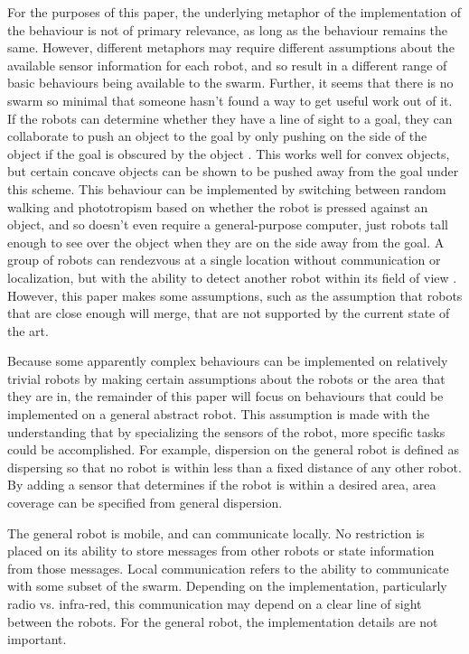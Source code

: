\documentclass[]{article}
\begin{document}
For the purposes of this paper, the underlying metaphor of the implementation of the behaviour is not of primary relevance, as long as the behaviour remains the same. 
However, different metaphors may require different assumptions about the available sensor information for each robot, and so result in a different range of basic behaviours being available to the swarm. 
Further, it seems that there is no swarm so minimal that someone hasn't found a way to get useful work out of it.  
If the robots can determine whether they have a line of sight to a goal, they can collaborate to push an object to the goal by only pushing on the side of the object if the goal is obscured by the object \cite{chen2015occlusion}. This works well for convex objects, but certain concave objects can be shown to be pushed away from the goal under this scheme. 
This behaviour can be implemented by switching between random walking and phototropism based on whether the robot is pressed against an object, and so doesn't even require a general-purpose computer, just robots tall enough to see over the object when they are on the side away from the goal. 
A group of robots can rendezvous at a single location without communication or localization, but with the ability to detect another robot within its field of view \cite{yu2012rendezvous}. However, this paper makes some assumptions, such as the assumption that robots that are close enough will merge, that are not supported by the current state of the art. 

Because some apparently complex behaviours can be implemented on relatively trivial robots by making certain assumptions about the robots or the area that they are in, the remainder of this paper will focus on behaviours that could be implemented on a general abstract robot. 
This assumption is made with the understanding that by specializing the sensors of the robot, more specific tasks could be accomplished. 
For example, dispersion on the general robot is defined as dispersing so that no robot is within less than a fixed distance of any other robot. 
By adding a sensor that determines if the robot is within a desired area, area coverage can be specified from general dispersion. 
 
The general robot is mobile, and can communicate locally. 
No restriction is placed on its ability to store messages from other robots or state information from those messages. 
Local communication refers to the ability to communicate with some subset of the swarm.
Depending on the implementation, particularly radio vs. infra-red, this communication may depend on a clear line of sight between the robots.
For the general robot, the implementation details are not important. 
\end{document}
